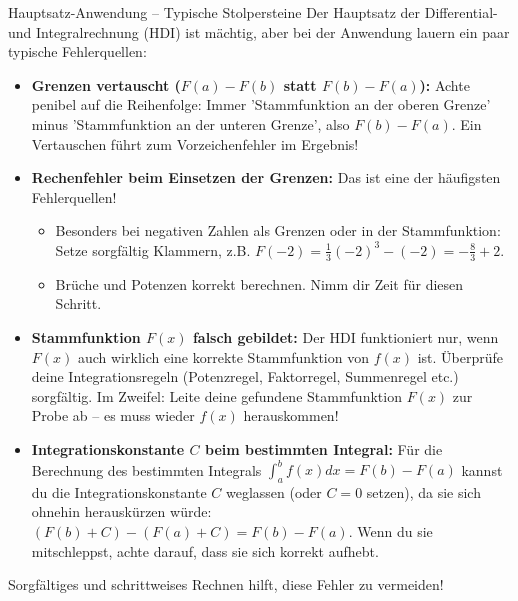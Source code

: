 \begin{fehlerboxumgebung}{Hauptsatz-Anwendung – Typische Stolpersteine}
Der Hauptsatz der Differential- und Integralrechnung (HDI) ist mächtig, aber bei der Anwendung lauern ein paar typische Fehlerquellen:
\begin{itemize}
    \item \textbf{Grenzen vertauscht ($F(a)-F(b)$ statt $F(b)-F(a)$):} Achte penibel auf die Reihenfolge: Immer 'Stammfunktion an der oberen Grenze' minus 'Stammfunktion an der unteren Grenze', also $F(b)-F(a)$. Ein Vertauschen führt zum Vorzeichenfehler im Ergebnis!
    \item \textbf{Rechenfehler beim Einsetzen der Grenzen:} Das ist eine der häufigsten Fehlerquellen!
    \begin{itemize}
        \item Besonders bei negativen Zahlen als Grenzen oder in der Stammfunktion: Setze sorgfältig Klammern, z.B. $F(-2) = \frac{1}{3}(-2)^3 - (-2) = -\frac{8}{3} + 2$.
        \item Brüche und Potenzen korrekt berechnen. Nimm dir Zeit für diesen Schritt.
    \end{itemize}
    \item \textbf{Stammfunktion $F(x)$ falsch gebildet:} Der HDI funktioniert nur, wenn $F(x)$ auch wirklich eine korrekte Stammfunktion von $f(x)$ ist. Überprüfe deine Integrationsregeln (Potenzregel, Faktorregel, Summenregel etc.) sorgfältig. Im Zweifel: Leite deine gefundene Stammfunktion $F(x)$ zur Probe ab – es muss wieder $f(x)$ herauskommen!
    \item \textbf{Integrationskonstante $C$ beim bestimmten Integral:} Für die Berechnung des bestimmten Integrals $\int_a^b f(x)dx = F(b)-F(a)$ kannst du die Integrationskonstante $C$ weglassen (oder $C=0$ setzen), da sie sich ohnehin herauskürzen würde: $(F(b)+C) - (F(a)+C) = F(b)-F(a)$. Wenn du sie mitschleppst, achte darauf, dass sie sich korrekt aufhebt.
\end{itemize}
Sorgfältiges und schrittweises Rechnen hilft, diese Fehler zu vermeiden!
\end{fehlerboxumgebung}

